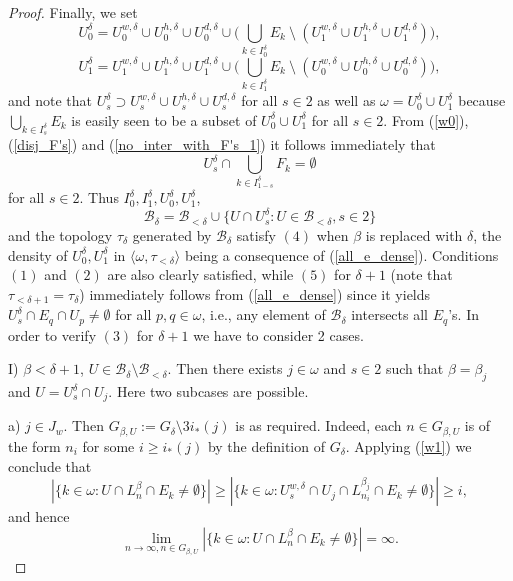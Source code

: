 \documentclass[12pt,a4paper]{amsart}
\theoremstyle{definition}
\newcommand{\w}{\omega}
\newcommand{\B}{\mathcal{B}}
\newcommand{\la}{\langle}
\newcommand{\ra}{\rangle}
\begin{document}
\begin{proof}



Finally, we set
$$U^{\delta}_0=U^{w,\delta}_0\cup U^{h,\delta}_0\cup U^{d,\delta}_0\cup\big(\bigcup_{k\in I^\delta_0}E_k \: \setminus\: 
(U^{w,\delta}_1\cup U^{h,\delta}_1\cup U^{d,\delta}_1)\big),$$
$$U^{\delta}_1=U^{w,\delta}_1\cup U^{h,\delta}_1\cup U^{d,\delta}_1\cup \big(\bigcup_{k\in I^\delta_1}E_k \: \setminus\: 
(U^{w,\delta}_0\cup U^{h,\delta}_0 \cup U^{d,\delta}_0)\big),$$
and note that 
$U^\delta_s\supset U^{w,\delta}_s\cup U^{h,\delta}_s\cup U^{d,\delta}_s$ for all $s\in 2$
as well as $\w=U^\delta_0\cup U^\delta_1$ because
$\bigcup_{k\in I^\delta_s}E_k$ is easily seen to be a subset of
$U^\delta_0\cup U^\delta_1$ for all $s\in 2$. From (\ref{w0}),  (\ref{disj_F's})
and (\ref{no_inter_with_F's_1}) it follows immediately that 
\begin{equation}\label{non-S-witness}
U^\delta_s\cap \bigcup_{k\in I^\delta_{1-s}}F_k=\emptyset
\end{equation} 
for all $s\in 2$. Thus $I^\delta_0, I^\delta_1,U^\delta_0, U^\delta_1$,
$$\B_\delta=\B_{<\delta}\cup\{U\cap U^\delta_s:U\in\B_{<\delta}, s\in 2\}$$
and the topology $\tau_\delta$ generated by $\B_\delta$
satisfy $(4) $ when $\beta$ is replaced with $\delta$, the density 
of $U^\delta_0, U^\delta_1$ in $\la\w,\tau_{<\delta}\ra$ being a consequence of
(\ref{all_e_dense}).
Conditions $(1)$ and $(2)$ are also clearly satisfied, while 
$(5)$ for $\delta+1$ 
(note that $\tau_{<\delta+1}=\tau_\delta$)  immediately follows from (\ref{all_e_dense}) since it yields
 $U^\delta_s\cap E_q\cap U_p\neq\emptyset$
for all $p,q\in\w$, i.e., any element of $\B_\delta$ intersects
all $E_q$'s. In order to verify $(3)$ for $\delta+1$
we have to consider 2 cases.

I)\;  $\beta<\delta+1$, $U\in\B_\delta\setminus\B_{<\delta}$.
Then there exists $j\in\w$ and $s\in 2$ such that
$\beta=\beta_j$ and $U=U^\delta_s\cap U_j$. Here two subcases are possible.

a)\;  $j\in J_w$. Then $G_{\beta,U}:=G_\delta\setminus 3i_*(j)$
is as required. Indeed, each $n\in G_{\beta,U}$ is of the form
$n_i$ for some $i\geq i_*(j)$ by the definition of $G_\delta$.
Applying (\ref{w1}) we conclude that  
$$|\{k\in\w:U\cap L^\beta_{n}\cap E_k\neq\emptyset\}|\geq |\{k\in\w: 
U^{w,\delta}_s\cap U_j\cap L^{\beta_j}_{n_i}\cap E_k\neq\emptyset\}|\geq i,$$
and hence 
$$\lim_{n\to\infty,n\in G_{\beta,U}}|\{k\in\w:U\cap L^\beta_{n}\cap E_k\neq\emptyset\}|=\infty.$$


\end{proof}
\end{document}
